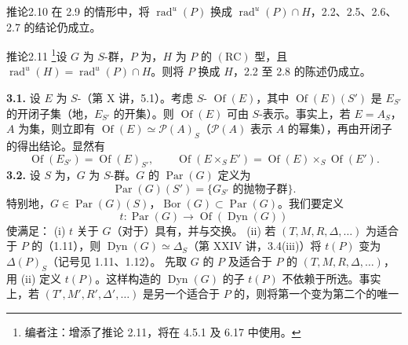 \begin{SGAresult}{推论}{2.10}
在 2.9 的情形中，将 $\operatorname{rad}^{u}(P)$ 换成 $\operatorname{rad}^{u}(P)\cap H$，2.2、2.5、2.6、2.7 的结论仍成立。
\end{SGAresult}
\begin{SGAresult}{推论}{2.11}
\footnote{编者注：增添了推论 2.11，将在 4.5.1 及 6.17 中使用。}设 $G$ 为 $S$-群，$P$ 为，$H$ 为 $P$ 的 $(\mathrm{RC})$ 型，且 $\operatorname{rad}^{u}(H)=\operatorname{rad}^{u}(P)\cap H$。则将 $P$ 换成 $H$，2.2 至 2.8 的陈述仍成立。
\end{SGAresult}
\textbf{3.1.} 设 $E$ 为 $S$-（第 X 讲，5.1）。考虑 $S$- $\operatorname{Of}(E)$，其中 $\operatorname{Of}(E)(S')$ 是 $E_{S'}$ 的开闭子集（地，$E_{S'}$ 的开集）。则 $\operatorname{Of}(E)$ 可由 $S$-表示。事实上，若 $E=A_S$，$A$ 为集，则立即有 $\operatorname{Of}(E)\simeq\mathcal P(A)_S$（$\mathcal P(A)$ 表示 $A$ 的幂集），再由开闭子的得出结论。显然有
\[\operatorname{Of}(E_{S'})=\operatorname{Of}(E)_{S'},\qquad\operatorname{Of}(E\times_SE')=\operatorname{Of}(E)\times_S\operatorname{Of}(E').\]
\textbf{3.2.} 设 $S$ 为，$G$ 为 $S$-群。$G$ 的 $\operatorname{Par}(G)$ 定义为
\[\operatorname{Par}(G)(S')=\{G_{S'}\text{ 的抛物子群}\}.\]
特别地，$G\in\operatorname{Par}(G)(S)$，$\operatorname{Bor}(G)\subset\operatorname{Par}(G)$。我们要定义
\[t:\operatorname{Par}(G)\longrightarrow\operatorname{Of}(\operatorname{Dyn}(G))\]
使满足：
(i) $t$ 关于 $G$（对于）具有，并与交换。
(ii) 若 $(T,M,R,\Delta,\ldots)$ 为适合于 $P$ 的（1.11），则 $\operatorname{Dyn}(G)\simeq\Delta_S$（第 XXIV 讲，3.4(iii)）将 $t(P)$ 变为 $\Delta(P)_S$（记号见 1.11、1.12）。
先取 $G$ 的 $P$ 及适合于 $P$ 的 $(T,M,R,\Delta,\ldots)$，用 (ii) 定义 $t(P)$。这样构造的 $\operatorname{Dyn}(G)$ 的子 $t(P)$ 不依赖于所选。事实上，若 $(T',M',R',\Delta',\ldots)$ 是另一个适合于 $P$ 的，则将第一个变为第二个的唯一
